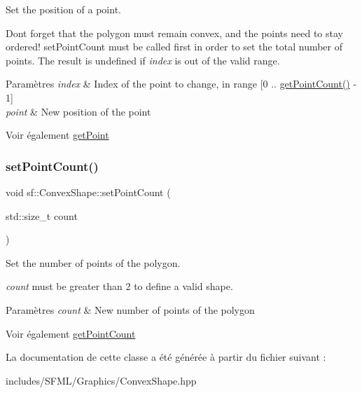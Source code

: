 Set the position of a point. 

Don\textquotesingle{}t forget that the polygon must remain convex, and the points need to stay ordered! set\+Point\+Count must be called first in order to set the total number of points. The result is undefined if {\itshape index} is out of the valid range.


\begin{DoxyParams}{Paramètres}
{\em index} & Index of the point to change, in range \mbox{[}0 .. \hyperlink{classsf_1_1ConvexShape_a0c54b8d48fe4e13414f6e667dbfc22a3}{get\+Point\+Count()} -\/ 1\mbox{]} \\
\hline
{\em point} & New position of the point\\
\hline
\end{DoxyParams}
\begin{DoxySeeAlso}{Voir également}
\hyperlink{classsf_1_1ConvexShape_a72a97bc426d8daf4d682a20fcb7f3fe7}{get\+Point} 
\end{DoxySeeAlso}
\mbox{\label{classsf_1_1ConvexShape_a56e6e79ade6dd651cc1a0e39cb68deae}} 
\subsubsection{\texorpdfstring{set\+Point\+Count()}{setPointCount()}}
{\footnotesize\ttfamily void sf\+::\+Convex\+Shape\+::set\+Point\+Count (\begin{DoxyParamCaption}\item[{std\+::size\+\_\+t}]{count }\end{DoxyParamCaption})}



Set the number of points of the polygon. 

{\itshape count} must be greater than 2 to define a valid shape.


\begin{DoxyParams}{Paramètres}
{\em count} & New number of points of the polygon\\
\hline
\end{DoxyParams}
\begin{DoxySeeAlso}{Voir également}
\hyperlink{classsf_1_1ConvexShape_a0c54b8d48fe4e13414f6e667dbfc22a3}{get\+Point\+Count} 
\end{DoxySeeAlso}


La documentation de cette classe a été générée à partir du fichier suivant \+:\begin{DoxyCompactItemize}
\item 
includes/\+S\+F\+M\+L/\+Graphics/Convex\+Shape.\+hpp\end{DoxyCompactItemize}

